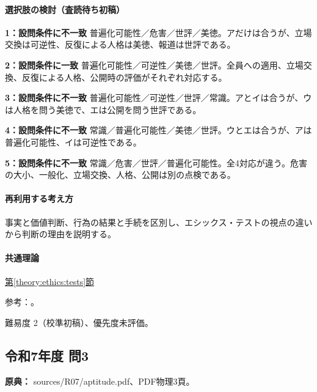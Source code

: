 \paragraph{選択肢の検討（査読待ち初稿）}\mbox{}\par

\noindent\textbf{1：設問条件に不一致} 普遍化可能性／危害／世評／美徳。アだけは合うが、立場交換は可逆性、反復による人格は美徳、報道は世評である。\par

\noindent\textbf{2：設問条件に一致} 普遍化可能性／可逆性／美徳／世評。全員への適用、立場交換、反復による人格、公開時の評価がそれぞれ対応する。\par

\noindent\textbf{3：設問条件に不一致} 普遍化可能性／可逆性／世評／常識。アとイは合うが、ウは人格を問う美徳で、エは公開を問う世評である。\par

\noindent\textbf{4：設問条件に不一致} 常識／普遍化可能性／美徳／世評。ウとエは合うが、アは普遍化可能性、イは可逆性である。\par

\noindent\textbf{5：設問条件に不一致} 常識／危害／世評／普遍化可能性。全4対応が違う。危害の大小、一般化、立場交換、人格、公開は別の点検である。\par

\paragraph{再利用する考え方} 事実と価値判断、行為の結果と手続を区別し、エシックス・テストの視点の違いから判断の理由を説明する。

\paragraph{共通理論} \hyperref[theory:ethics:tests]{第\ref*{theory:ethics:tests}節}

\par 参考：\cite{davis_seven_steps}。

\par 難易度 2（校準初稿）、優先度未評価。

\subsection{令和7年度 問3}
\label{q:r07-reg-apt-03}

\noindent\textbf{原典：} sources/R07/aptitude.pdf、PDF物理3頁。

